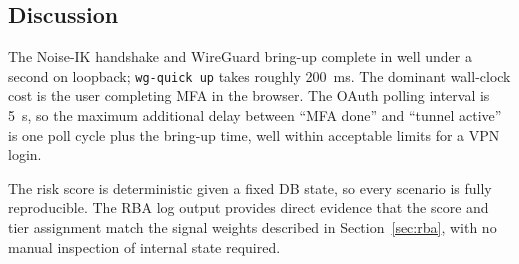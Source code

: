 \subsection{Discussion}

The Noise-IK handshake and WireGuard bring-up complete in well under a
second on loopback; \texttt{wg-quick up} takes roughly 200~ms.
The dominant wall-clock cost is the user completing MFA in the browser.
The OAuth polling interval is 5~s, so the maximum additional delay between
``MFA done'' and ``tunnel active'' is one poll cycle plus the bring-up
time, well within acceptable limits for a VPN login.

The risk score is deterministic given a fixed DB state, so every scenario
is fully reproducible.
The RBA log output provides direct evidence that the score and tier
assignment match the signal weights described in Section~\ref{sec:rba},
with no manual inspection of internal state required.
